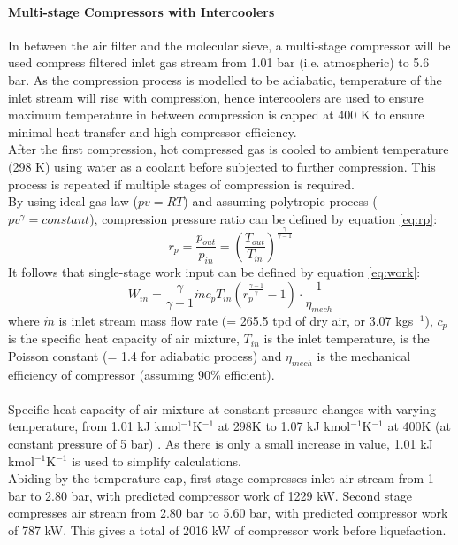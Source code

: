 \documentclass[11pt,oneside]{article}
\let\subsubsubsection\paragraph
\begin{document}
        \subsubsubsection{Multi-stage Compressors with Intercoolers}
        In between the air filter and the molecular sieve, a multi-stage compressor will be used compress filtered inlet gas stream from 1.01 bar (i.e. atmospheric) to 5.6 bar. As the compression process is modelled to be adiabatic, temperature of the inlet stream will rise with compression, hence intercoolers are used to ensure maximum temperature in between compression is capped at 400 K to ensure minimal heat transfer and high compressor efficiency. \\
        After the first compression, hot compressed gas is cooled to ambient temperature (298 K) using water as a coolant before subjected to further compression. This process is repeated if multiple stages of compression is required.\\
        By using ideal gas law ($pv=RT$) and assuming polytropic process ($pv^\gamma=constant$), compression pressure ratio can be defined by equation \ref{eq:rp}:
        \begin{equation}
            r_p = \frac{p_{out}}{p_{in}} = \left(\frac{T_{out}}{T_{in}}\right)^\frac{\gamma}{\gamma-1}
            \label{eq:rp}
        \end{equation}
        It follows that single-stage work input can be defined by equation \ref{eq:work}:
        \begin{equation}
            W_{in}=\frac{\gamma}{\gamma-1}\dot{m}c_pT_{in}\left(r_p^{\frac{\gamma-1}{\gamma}}-1\right)\cdot\frac{1}{\eta_{mech}}
            \label{eq:work}
        \end{equation}
        where $\dot{m}$ is inlet stream mass flow rate (= 265.5 tpd of dry air, or 3.07 kgs$^{-1}$), $c_p$ is the specific heat capacity of air mixture, $T_{in}$ is the inlet temperature, {\textgamma} is the Poisson constant (= 1.4 for adiabatic process) and ${\eta}_{mech}$ is the mechanical efficiency of compressor (assuming 90\% efficient).\\
        \\
        Specific heat capacity of air mixture at constant pressure changes with varying temperature, from 1.01 kJ kmol$^{-1}$K$^{-1}$ at 298K to 1.07 kJ kmol$^{-1}$K$^{-1}$ at 400K (at constant pressure of 5 bar) \citep{engtoolbox_cp}. As there is only a small increase in value, 1.01 kJ kmol$^{-1}$K$^{-1}$ is used to simplify calculations. \\  
        Abiding by the temperature cap, first stage compresses inlet air stream from 1 bar to 2.80 bar, with predicted compressor work of 1229 kW. Second stage compresses air stream from 2.80 bar to 5.60 bar, with predicted compressor work of 787 kW. This gives a total of 2016 kW of compressor work before liquefaction.
\end{document}
